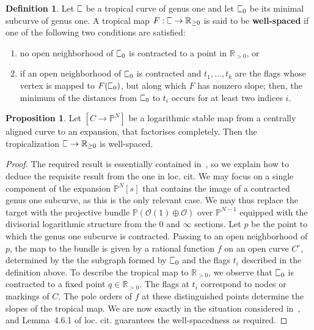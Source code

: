 \documentclass[11pt]{amsart}
\newcommand{\plC}{\scalebox{0.8}[1.3]{$\sqsubset$}}
\renewcommand{\to}{\rightarrow}
\theoremstyle{definition}
\newtheorem{prop}[thm]{Proposition}
\theoremstyle{definition}
\newtheorem{definition}[thm]{Definition}
\begin{document}
\begin{definition}
Let $\plC$ be a tropical curve of genus one and let $\plC_0$ be its minimal subcurve of genus one. A tropical map $F: \plC\to \mathbb R_{\geq 0}$ is said to be \textbf{well-spaced} if one of the following two conditions are satisfied:
\begin{enumerate}
    \item no open neighborhood of $\plC_0$ is contracted to a point in $\mathbb R_{>0}$, or
    \item if an open neighborhood of $\plC_0$ is contracted and $t_1,\ldots,t_k$ are the flags whose vertex is mapped to $F(\plC_0)$, but along which $F$ has nonzero slope; then, the minimum of the distances from $\plC_0$ to $t_i$ occurs for at least two indices $i$.
\end{enumerate}
\end{definition}

\begin{prop}\label{prop: well-spaced}
Let $[C\to \mathbb P^N]$ be a logarithmic stable map from a centrally aligned curve to an expansion, that factorises completely. Then the tropicalization $\plC\to \mathbb R_{\geq 0}$ is well-spaced.
\end{prop}

\begin{proof}
The required result is essentially contained in~\cite[Section 4]{RSPW2}, so we explain how to deduce the requisite result from the one in loc. cit. We may focus on a single component of the expansion $\mathbb P^N[s]$ that contains the image of a contracted genus one subcurve, as this is the only relevant case. We may thus replace the target with the projective bundle $\mathbb P(\mathcal O(1)\oplus \mathcal O)$ over $\mathbb P^{N-1}$ equipped with the divisorial logarithmic structure from the $0$ and $\infty$ sections. Let $p$ be the point to which the genus one subcurve is contracted. Passing to an open neighborhood of $p$, the map to the bundle is given by a rational function $f$ on an open curve $C^\circ$, determined by the the subgraph formed by $\plC_0$ and the flags $t_i$ described in the definition above. To describe the tropical map to $\mathbb R_{>0}$, we observe that $\plC_0$ is contracted to a fixed point $q\in\mathbb R_{>0}$. The flags at $t_i$ correspond to nodes or markings of $C$. The pole orders of $f$ at these distinguished points determine the slopes of the tropical map. We are now exactly in the situation considered in~\cite[Second Paragraph of \S~4.6]{RSPW2}, and Lemma~4.6.1 of loc. cit. guarantees the well-spacedness as required.
\end{proof}
\end{document}
